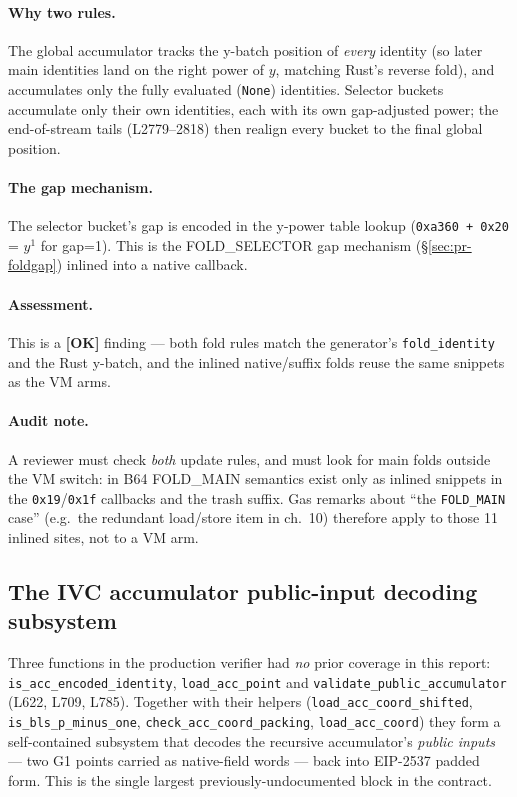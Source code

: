 \paragraph{Why two rules.} The global accumulator tracks the
y-batch position of \emph{every} identity (so later main
identities land on the right power of $y$, matching Rust's
reverse fold), and accumulates only the fully evaluated
(\texttt{None}) identities. Selector buckets accumulate only their
own identities, each with its own gap-adjusted power; the
end-of-stream tails (L2779--2818) then realign every bucket to the
final global position.

\paragraph{The gap mechanism.} The selector bucket's gap is
encoded in the y-power table lookup (\texttt{0xa360 + 0x20} =
$y^1$ for gap=1). This is the FOLD\_SELECTOR gap mechanism
(§\ref{sec:pr-foldgap}) inlined into a native callback.

\paragraph{Assessment.} This is a
\textcolor{tracegreen}{\textbf{[OK]}} finding --- both fold rules
match the generator's \texttt{fold\_identity} and the Rust
y-batch, and the inlined native/suffix folds reuse the same
snippets as the VM arms.

\paragraph{Audit note.} A reviewer must check \emph{both} update
rules, and must look for main folds outside the VM switch: in B64
FOLD\_MAIN semantics exist only as inlined snippets in the
\texttt{0x19}/\texttt{0x1f} callbacks and the trash suffix. Gas
remarks about ``the \texttt{FOLD\_MAIN} case'' (e.g.\ the
redundant load/store item in ch.~10) therefore apply to those 11
inlined sites, not to a VM arm.

\subsection{The IVC accumulator public-input decoding subsystem}
\label{sec:pr-acc-decode-subsys}

Three functions in the production verifier had \emph{no} prior
coverage in this report: \texttt{is\_acc\allowbreak\_encoded\allowbreak\_identity},
\texttt{load\allowbreak\_acc\allowbreak\_point} and
\texttt{validate\allowbreak\_public\allowbreak\_accumulator}
(L622, L709, L785). Together with their helpers
(\texttt{load\allowbreak\_acc\allowbreak\_coord\allowbreak\_shifted},
\texttt{is\allowbreak\_bls\allowbreak\_p\allowbreak\_minus\allowbreak\_one},
\texttt{check\allowbreak\_acc\allowbreak\_coord\allowbreak\_packing},
\texttt{load\allowbreak\_acc\allowbreak\_coord}) they form a
self-contained subsystem that decodes the recursive accumulator's
\emph{public inputs} --- two G1 points carried as native-field
words --- back into EIP-2537 padded form. This is the single
largest previously-undocumented block in the contract.

